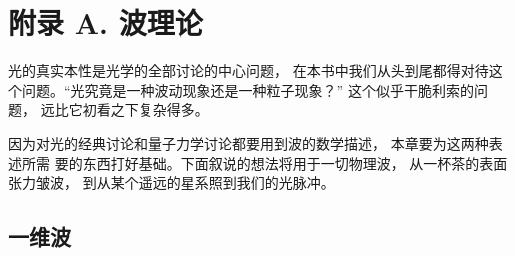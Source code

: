 \documentclass[UTF8]{report}
\theoremstyle{MyLineTheoremStyle} %
\theoremstyle{MyBlockTheoremStyle} %
\theoremstyle{MySubsubsectionStyle} %
\begin{document}
\nocite{*}

\thispagestyle{fancy} 























\newpage
\appendix
\titleformat{\chapter}[hang]{\normalfont\huge\bfseries\centering}{}{20pt}{}
\titlespacing*{\chapter}{0pt}{-25pt}{8pt} %
\titleformat{\section}[hang]{\normalfont\centering\Large\bfseries}{\thesection}{8pt}{}

\chapter*{附录 A. 波理论}   
\thispagestyle{fancy} 
\setcounter{section}{0}   
\renewcommand\thesection{A.\arabic{section}}   
\renewcommand{\thefigure}{A.\arabic{figure}} 
\renewcommand{\thetable}{A.\arabic{table}}


光的真实本性是光学的全部讨论的中心问题， 在本书中我们从头到尾都得对待这个问题。“光究竟是一种波动现象还是一种粒子现象？” 这个似乎干脆利索的问题， 远比它初看之下复杂得多。

因为对光的经典讨论和量子力学讨论都要用到波的数学描述， 本章要为这两种表述所需
要的东西打好基础。下面叙说的想法将用于一切物理波， 从一杯茶的表面张力皱波， 到从某个遥远的星系照到我们的光脉冲。

\section{一维波}
\end{document}
